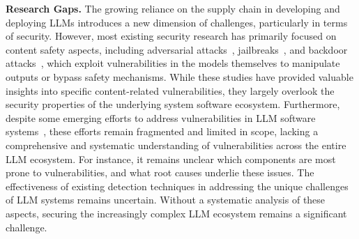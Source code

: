 \noindent \textbf{Research Gaps.} The growing reliance on the supply chain in developing and deploying LLMs introduces a new dimension of challenges, particularly in terms of security. However, most existing security research has primarily focused on content safety aspects, including adversarial attacks~\cite{liu2024adversary,andy2023universal}, jailbreaks~\cite{shen2024dan,xu2024jailbreak}, and backdoor attacks~\cite{li2024backdoorllm,zhao2025surveybackdoor}, which exploit vulnerabilities in the models themselves to manipulate outputs or bypass safety mechanisms. While these studies have provided valuable insights into specific content-related vulnerabilities, they largely overlook the security properties of the underlying system software ecosystem.  
Furthermore, despite some emerging efforts to address vulnerabilities in LLM software systems~\cite{zhao2024malhug,zhu2025tensorflow,liu2024llmrce,pedro2025prompt2sql}, these efforts remain fragmented and limited in scope, lacking a comprehensive and systematic understanding of vulnerabilities across the entire LLM ecosystem. For instance, it remains unclear which components are most prone to vulnerabilities, and what root causes underlie these issues. The effectiveness of existing detection techniques in addressing the unique challenges of LLM systems remains uncertain. Without a systematic analysis of these aspects, securing the increasingly complex LLM ecosystem remains a significant challenge.

